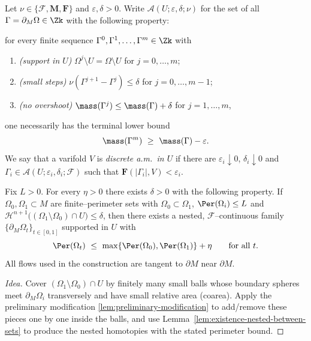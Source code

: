 \begin{definition}\label{def:dis-am-rel}
Let $\nu\in\{\mathcal F,\mathbf M,\mathbf F\}$ and $\varepsilon,\delta>0$.
Write $\mathscr A(U;\varepsilon,\delta;\nu)$ for the set of all
$\Gamma=\partial_M\Omega\in\Zk$ with the following property:

for every finite sequence $\Gamma^0,\Gamma^1,\dots,\Gamma^m\in\Zk$ with
\begin{enumerate}[label=(\roman*)]
\item \emph{(support in $U$)} $\Omega^j\setminus U=\Omega\setminus U$ for $j=0,\dots,m$;
\item \emph{(small steps)} $\nu(\Gamma^{j+1}-\Gamma^{j})\le \delta$ for $j=0,\dots,m-1$;
\item \emph{(no overshoot)} $\mass(\Gamma^{j})\le \mass(\Gamma)+\delta$ for $j=1,\dots,m$,
\end{enumerate}
one necessarily has the terminal lower bound
\[
\mass(\Gamma^{m})\ \ge\ \mass(\Gamma)-\varepsilon.
\]
We say that a varifold $V$ is \emph{discrete a.m.\ in $U$} if there are
$\varepsilon_i\downarrow 0$, $\delta_i\downarrow 0$ and $\Gamma_i\in\mathscr A(U;\varepsilon_i,\delta_i;\mathcal F)$
such that $\mathbf F(|\Gamma_i|,V)<\varepsilon_i$.
\end{definition}

\begin{lemma}\label{lem:relative-interpolation}
Fix $L>0$. For every $\eta>0$ there exists $\delta>0$ with the following property.
If $\Omega_0,\Omega_1\subset M$ are finite–perimeter sets with $\Omega_0\subset\Omega_1$,
$\Per(\Omega_i)\le L$ and $\mathcal{H}^{n+1}\big((\Omega_1\setminus\Omega_0)\cap U\big)\le \delta$,
then there exists a nested, $\mathcal F$–continuous family
$\{\partial_M\Omega_t\}_{t\in[0,1]}$ supported in $U$ with
\[
\Per(\Omega_t)\ \le\ \max\{\Per(\Omega_0),\Per(\Omega_1)\}+\eta\qquad\text{for all }t.
\]
All flows used in the construction are tangent to $\partial M$ near $\partial M$.
\end{lemma}

\begin{proof}[Idea]
Cover $(\Omega_1\!\setminus\!\Omega_0)\cap U$ by finitely many small balls whose boundary spheres
meet $\partial_M\Omega_i$ transversely and have small relative area (coarea).
Apply the preliminary modification \ref{lem:preliminary-modification} to add/remove these pieces
one by one inside the balls, and use Lemma~\ref{lem:existence-nested-between-sets} to produce the
nested homotopies with the stated perimeter bound.
\end{proof}

